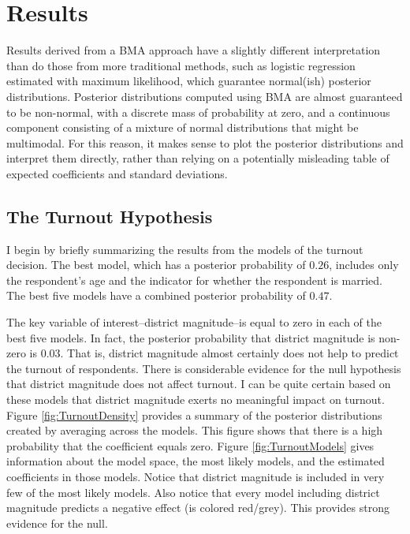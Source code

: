 \documentclass[12pt]{article}
\begin{document}
\section*{Results}

Results derived from a BMA approach have a slightly different interpretation than do those from more traditional methods, such as logistic regression estimated with maximum likelihood, which guarantee normal(ish) posterior distributions. Posterior distributions computed using BMA are almost guaranteed to be non-normal, with a discrete mass of probability at zero, and a continuous component consisting of a mixture of normal distributions that might be multimodal. For this reason, it makes sense to plot the posterior distributions and interpret them directly, rather than relying on a potentially misleading table of expected coefficients and standard deviations.

\subsection*{The Turnout Hypothesis}

I begin by briefly summarizing the results from the models of the turnout decision. The best model, which has a posterior probability of $0.26$, includes only the respondent's age and the indicator for whether the respondent is married. The best five models have a combined posterior probability of $0.47$.

The key variable of interest--district magnitude--is equal to zero in each of the best five models. In fact, the posterior probability that district magnitude is non-zero is $0.03$. That is, district magnitude almost certainly does not help to predict the turnout of respondents. There is considerable evidence for the null hypothesis that district magnitude does not affect turnout. I can be quite certain based on these  models that district magnitude exerts no meaningful impact on turnout. Figure \ref{fig:TurnoutDensity} provides a summary of the posterior distributions created by averaging across the models. This figure shows that there is a high probability that the coefficient equals zero. Figure \ref{fig:TurnoutModels} gives information about the model space, the most likely models, and the estimated coefficients in those models. Notice that district magnitude is included in very few of the most likely models. Also notice that every model including district magnitude predicts a negative effect (is colored red/grey). This provides strong evidence for the null. 
\end{document}
